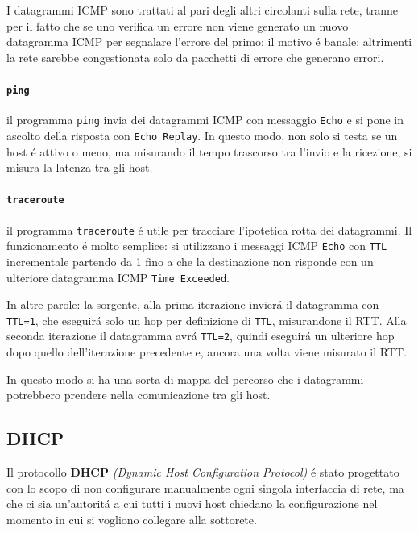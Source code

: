 \documentclass[12pt]{article}
\def\code#1{\texttt{#1}}
\begin{document}
I datagrammi ICMP sono trattati al pari degli altri circolanti sulla rete, tranne per il fatto che se uno verifica un 
errore non viene generato un nuovo datagramma ICMP per segnalare l'errore del primo; il motivo \'e banale: altrimenti la 
rete sarebbe congestionata solo da pacchetti di errore che generano errori.

\paragraph{\code{ping}} il programma \code{ping} invia dei datagrammi ICMP con messaggio \code{Echo} e si pone in ascolto 
della risposta con \code{Echo Replay}. In questo modo, non solo si testa se un host \'e attivo o meno, ma misurando il 
tempo trascorso tra l'invio e la ricezione, si misura la latenza tra gli host.

\paragraph{\code{traceroute}} il programma \code{traceroute} \'e utile per tracciare l'ipotetica rotta dei datagrammi. Il 
funzionamento \'e molto semplice: si utilizzano i messaggi ICMP \code{Echo} con \code{TTL} incrementale partendo da 1 
fino a che la destinazione non risponde con un ulteriore datagramma ICMP \code{Time Exceeded}. 

In altre parole: la sorgente, alla prima iterazione invier\'a il datagramma con \code{TTL=1}, che eseguir\'a solo un hop 
per definizione di \code{TTL}, misurandone il RTT. Alla seconda iterazione il datagramma avr\'a \code{TTL=2}, quindi 
eseguir\'a un ulteriore hop dopo quello dell'iterazione precedente e, ancora una volta viene misurato il RTT.

In questo modo si ha una sorta di mappa del percorso che i datagrammi potrebbero prendere nella comunicazione tra gli 
host.

\clearpage
\subsection{DHCP}\label{spazio-indirizzamento-in-ip-dhcp}
Il protocollo \textbf{DHCP} \textit{(Dynamic Host Configuration Protocol)} \'e stato progettato con lo scopo di non 
configurare manualmente ogni singola interfaccia di rete, ma che ci sia un'autorit\'a a cui tutti i nuovi host chiedano la 
configurazione nel momento in cui si vogliono collegare alla sottorete.
\end{document}
